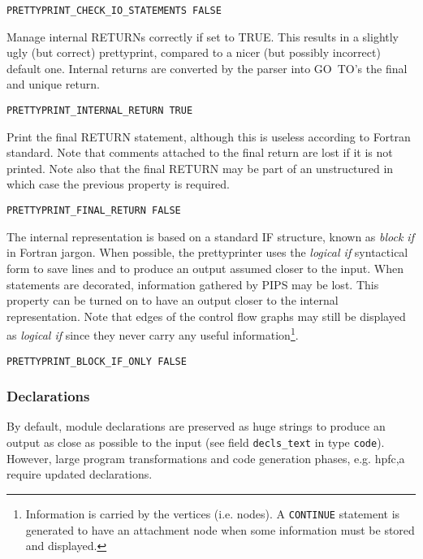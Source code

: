 \begin{verbatim}
PRETTYPRINT_CHECK_IO_STATEMENTS FALSE
\end{verbatim}

Manage internal RETURNs correctly if set to TRUE.  This results in a
slightly ugly (but correct) prettyprint, compared to a nicer (but
possibly incorrect) default one. Internal returns are converted by the
parser into GO~TO's the final and unique return.

\begin{verbatim}
PRETTYPRINT_INTERNAL_RETURN TRUE
\end{verbatim}

Print the final RETURN statement, although this is useless according to
Fortran standard. Note that comments attached to the final return are
lost if it is not printed. Note also that the final RETURN may be part
of an unstructured in which case the previous property is required.

\begin{verbatim}
PRETTYPRINT_FINAL_RETURN FALSE
\end{verbatim}

The internal representation is based on a standard IF structure, known as
{\em block if} in Fortran jargon. When possible, the prettyprinter uses
the {\em logical if} syntactical form to save lines and to produce an
output assumed closer to the input. When statements are decorated,
information gathered by PIPS may be lost. This property can be turned on
to have an output closer to the internal representation. Note that edges
of the control flow graphs may still be displayed as {\em logical if}
since they never carry any useful information\footnote{Information is
carried by the vertices (i.e. nodes). A \verb/CONTINUE/ statement is
generated to have an attachment node when
some information must be stored and displayed.}.

\begin{verbatim}
PRETTYPRINT_BLOCK_IF_ONLY FALSE
\end{verbatim}

\subsubsection{Declarations}

By default, module declarations are preserved as huge strings to produce
an output as close as possible to the input (see field \verb/decls_text/
in type \verb/code/). However, large program transformations and code
generation phases, e.g. hpfc,a require updated declarations.

